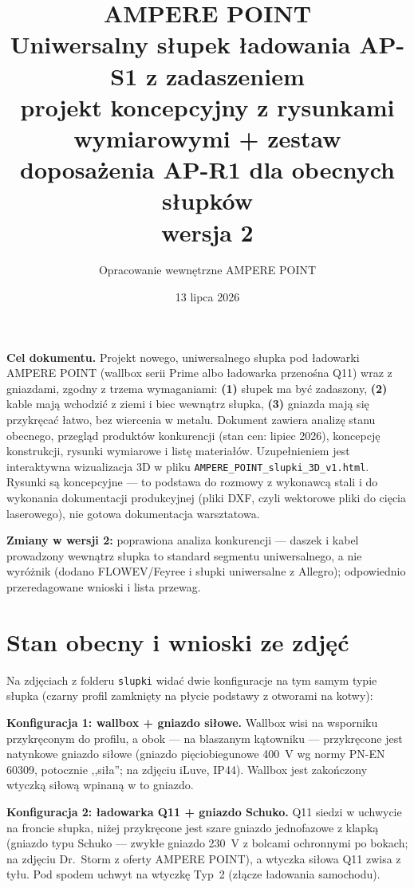 \documentclass[11pt,a4paper]{article}
\title{\textbf{\color{apnavy}AMPERE POINT}\\[4pt]
\large Uniwersalny słupek ładowania AP-S1 z zadaszeniem\\[2pt]
\normalsize projekt koncepcyjny z rysunkami wymiarowymi + zestaw doposażenia AP-R1 dla obecnych słupków\\
wersja 2}
\author{Opracowanie wewnętrzne AMPERE POINT}
\date{13 lipca 2026}
\begin{document}
\maketitle
\vspace{-1.4em}

\noindent\textbf{Cel dokumentu.} Projekt nowego, uniwersalnego słupka pod ładowarki AMPERE POINT
(wallbox serii Prime albo ładowarka przenośna Q11) wraz z gniazdami, zgodny z trzema wymaganiami:
\textbf{(1)} słupek ma być zadaszony, \textbf{(2)} kable mają wchodzić z ziemi i biec wewnątrz słupka,
\textbf{(3)} gniazda mają się przykręcać łatwo, bez wiercenia w metalu. Dokument zawiera analizę
stanu obecnego, przegląd produktów konkurencji (stan cen: lipiec 2026), koncepcję konstrukcji,
rysunki wymiarowe i listę materiałów. Uzupełnieniem jest interaktywna wizualizacja 3D w pliku
\texttt{AMPERE\_POINT\_slupki\_3D\_v1.html}. Rysunki są koncepcyjne --- to podstawa do rozmowy
z wykonawcą stali i do wykonania dokumentacji produkcyjnej (pliki DXF, czyli wektorowe pliki
do cięcia laserowego), nie gotowa dokumentacja warsztatowa.

\textbf{Zmiany w wersji 2:} poprawiona analiza konkurencji --- daszek i kabel prowadzony wewnątrz
słupka to standard segmentu uniwersalnego, a nie wyróżnik (dodano FLOWEV/Feyree i słupki
uniwersalne z Allegro); odpowiednio przeredagowane wnioski i lista przewag.

\tableofcontents

\section{Stan obecny i wnioski ze zdjęć}
Na zdjęciach z folderu \texttt{slupki} widać dwie konfiguracje na tym samym typie słupka
(czarny profil zamknięty na płycie podstawy z otworami na kotwy):

\textbf{Konfiguracja 1: wallbox + gniazdo siłowe.} Wallbox wisi na wsporniku przykręconym do
profilu, a obok --- na blaszanym kątowniku --- przykręcone jest natynkowe gniazdo siłowe
(gniazdo pięciobiegunowe 400~V wg normy PN-EN 60309, potocznie ,,siła''; na zdjęciu iLuve, IP44).
Wallbox jest zakończony wtyczką siłową wpinaną w to gniazdo.

\textbf{Konfiguracja 2: ładowarka Q11 + gniazdo Schuko.} Q11 siedzi w uchwycie na froncie słupka,
niżej przykręcone jest szare gniazdo jednofazowe z klapką (gniazdo typu Schuko --- zwykłe gniazdo
230~V z bolcami ochronnymi po bokach; na zdjęciu Dr.~Storm z oferty AMPERE POINT), a wtyczka
siłowa Q11 zwisa z tyłu. Pod spodem uchwyt na wtyczkę Typ~2 (złącze ładowania samochodu).
\end{document}
